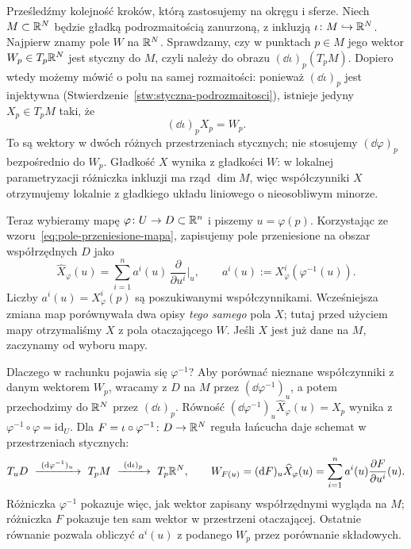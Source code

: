 \begin{uwaga}
Prześledźmy kolejność kroków, którą zastosujemy na okręgu i sferze.
Niech $M\subset\mathbb{R}^N$ będzie gładką podrozmaitością zanurzoną,
z inkluzją
$\iota\colon M\hookrightarrow\mathbb{R}^N$. Najpierw znamy pole $W$
na $\mathbb{R}^N$. Sprawdzamy, czy w punktach $p\in M$ jego wektor
$W_p\in T_p\mathbb{R}^N$ jest styczny do $M$, czyli należy do obrazu
$(\dd\iota)_p(T_pM)$. Dopiero wtedy możemy mówić o polu na samej
rozmaitości: ponieważ $(\dd\iota)_p$ jest injektywna
(Stwierdzenie~\ref{stw:styczna-podrozmaitosci}), istnieje
jedyny $X_p\in T_pM$ taki, że
\[
(\dd\iota)_pX_p=W_p.
\]
To są wektory w dwóch różnych przestrzeniach stycznych;
nie stosujemy $(\dd\varphi)_p$ bezpośrednio do $W_p$.
Gładkość $X$ wynika z gładkości $W$: w lokalnej parametryzacji
różniczka inkluzji ma rząd $\dim M$, więc współczynniki $X$
otrzymujemy lokalnie z gładkiego układu liniowego o nieosobliwym minorze.

Teraz wybieramy mapę $\varphi\colon U\to D\subset\mathbb{R}^n$ i piszemy
$u=\varphi(p)$. Korzystając ze wzoru~\eqref{eq:pole-przeniesione-mapa},
zapisujemy pole przeniesione na obszar współrzędnych $D$ jako
\[
\widehat X_\varphi(u)
=\sum_{i=1}^n a^i(u)\,
  \frac{\partial}{\partial u^i}\Big|_u,
\qquad a^i(u):=X_\varphi^i(\varphi^{-1}(u)).
\]
Liczby $a^i(u)=X_\varphi^i(p)$ są poszukiwanymi współczynnikami.
Wcześniejsza zmiana map porównywała dwa opisy \emph{tego samego}
pola $X$; tutaj przed użyciem mapy otrzymaliśmy $X$ z pola
otaczającego $W$. Jeśli $X$ jest już dane na $M$, zaczynamy
od wyboru mapy.

Dlaczego w rachunku pojawia się $\varphi^{-1}$? Aby porównać
nieznane współczynniki z danym wektorem $W_p$, wracamy z $D$
na $M$ przez $(\dd\varphi^{-1})_u$, a potem przechodzimy
do $\mathbb{R}^N$ przez $(\dd\iota)_p$. Równość
$(\dd\varphi^{-1})_u\widehat X_\varphi(u)=X_p$ wynika
z~$\varphi^{-1}\circ\varphi=\mathrm{id}_U$. Dla
$F=\iota\circ\varphi^{-1}\colon D\to\mathbb{R}^N$ reguła łańcucha daje
schemat w przestrzeniach stycznych:
\[
T_uD\ \xrightarrow{\ (\dd\varphi^{-1})_u\ }\ T_pM
\ \xrightarrow{\ (\dd\iota)_p\ }\ T_p\R^N,
\qquad
W_{F(u)}=(\dd F)_u\widehat X_\varphi(u)
=\sum_{i=1}^n a^i(u)\frac{\partial F}{\partial u^i}(u).
\]
Różniczka $\varphi^{-1}$ pokazuje więc, jak wektor zapisany
współrzędnymi wygląda na $M$; różniczka $F$ pokazuje ten sam
wektor w przestrzeni otaczającej. Ostatnie równanie pozwala
obliczyć $a^i(u)$ z podanego $W_p$ przez porównanie składowych.
\end{uwaga}

